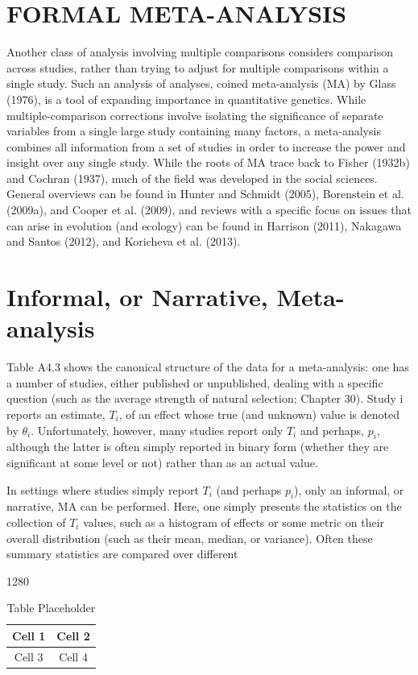 \documentclass{article}
\begin{document}
\section{FORMAL META-ANALYSIS}
Another class of analysis involving multiple comparisons considers comparison across studies, rather than trying to adjust for multiple comparisons within a single study. Such an analysis of analyses, coined meta-analysis (MA) by Glass (1976), is a tool of expanding importance in quantitative genetics. While multiple-comparison corrections involve isolating the significance of separate variables from a single large study containing many factors, a meta-analysis combines all information from a set of studies in order to increase the power and insight over any single study. While the roots of MA trace back to Fisher (1932b) and Cochran (1937), much of the field was developed in the social sciences. General overviews can be found in Hunter and Schmidt (2005), Borenstein et al. (2009a), and Cooper et al. (2009), and reviews with a specific focus on issues that can arise in evolution (and ecology) can be found in Harrison (2011), Nakagawa and Santos (2012), and Koricheva et al. (2013).

\section{Informal, or Narrative, Meta-analysis}
Table A4.3 shows the canonical structure of the data for a meta-analysis: one has a number of studies, either published or unpublished, dealing with a specific question (such as the average strength of natural selection; Chapter 30). Study i reports an estimate,  $ T_i $, of an effect whose true (and unknown) value is denoted by  $ \theta_i $. Unfortunately, however, many studies report only  $ T_i $ and perhaps,  $ p_i $, although the latter is often simply reported in binary form (whether they are significant at some level or not) rather than as an actual value.

In settings where studies simply report  $ T_{i} $ (and perhaps  $ p_{i} $), only an informal, or narrative, MA can be performed. Here, one simply presents the statistics on the collection of  $ T_{i} $ values, such as a histogram of effects or some metric on their overall distribution (such as their mean, median, or variance). Often these summary statistics are compared over different

1280

\begin{table}[h]
\centering
\begin{tabular}{|c|c|}
\hline
Cell 1 & Cell 2 \\
\hline
Cell 3 & Cell 4 \\
\hline
\end{tabular}
\caption{Table Placeholder}
\end{table}
\end{document}
